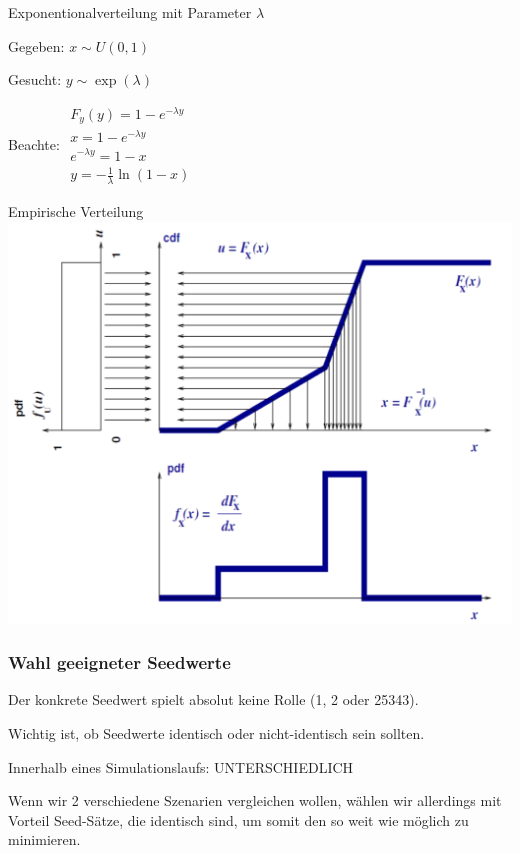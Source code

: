 \begin{multicols}{2}
	\begin{example} 
		Exponentionalverteilung mit Parameter $\lambda$ \\
		\begin{compactitem}
			\item Gegeben: $x\sim U(0, 1)$
			\item Gesucht: $y\sim \exp (\lambda)$
			\item Beachte: $\begin{array}{l}
								F_y(y) = 1-e^{-\lambda y} \\
								x = 1-e^{-\lambda y} \\
								e^{-\lambda y} = 1-x\\
								y = -\frac{1}{\lambda}\ln (1-x)
							\end{array}$
		\end{compactitem}
	\end{example}
	\begin{example} 
		Empirische Verteilung \\
		\includegraphics[width=1\textwidth]{pictures/inversionsmethode2} 
	\end{example}
\end{multicols}

\subsubsection{Wahl geeigneter Seedwerte}
\begin{compactitem}
	\item Der konkrete Seedwert spielt absolut keine Rolle (1, 2 oder 25343).
	\item Wichtig ist, ob Seedwerte identisch oder nicht-identisch sein sollten.
	\item Innerhalb eines Simulationslaufs: UNTERSCHIEDLICH
	\item Wenn wir 2 verschiedene Szenarien vergleichen wollen, wählen wir allerdings mit Vorteil Seed-Sätze, die identisch sind, um somit den  so weit wie möglich zu minimieren.
\end{compactitem}

